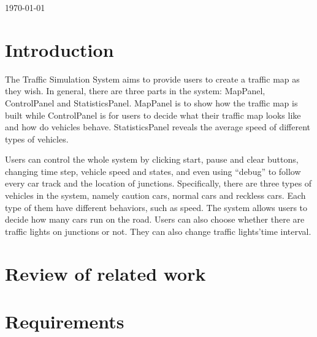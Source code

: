 \documentclass[a4paper,12pt]{article}
\begin{document}
\begin{titlepage}
{\large \today}\\[3cm] %


 

\vfill %

\end{titlepage}


\tableofcontents

\section{Introduction}
The Traffic Simulation System aims to provide users to create a traffic map as they wish. In general, there are three parts in the system: MapPanel, ControlPanel and StatisticsPanel. MapPanel is to show how the traffic map is built while ControlPanel is for users to decide what their traffic map looks like and how do vehicles behave. StatisticsPanel reveals the average speed of different types of vehicles.

Users can control the whole system by clicking start, pause and clear buttons, changing time step, vehicle speed and states, and even using “debug” to follow every car track and the location of junctions. Specifically, there are three types of vehicles in the system, namely caution cars, normal cars and reckless cars. Each type of them have different behaviors, such as speed. The system allows users to decide how many cars run on the road. Users can also choose whether there are traffic lights on junctions or not. They can also change traffic lights’time interval.

\section{Review of related work}

\section{Requirements}
\end{document}
